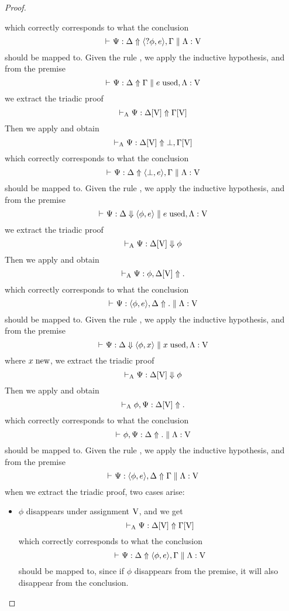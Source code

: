 \begin{proof}
\begin{itemize}
			which correctly corresponds to what the conclusion
			$$ \async{\Psi}{\Delta}{\af{\llwn{\phi}}{e}, \Gamma} \separator \constr{\Lambda}{\mathV} $$
			should be mapped to.
		\indCase{\displaybot} Given the rule \derRule{\displaybot}, we apply the inductive hypothesis, and from the premise
			$$ \async{\Psi}{\Delta}{\Gamma} \separator \constr{\used{e}, \Lambda}{\mathV} $$
			we extract the triadic proof
			$$ \async[A]{\Psi}{\Delta[\mathV]}{\Gamma[\mathV]} $$
			Then we apply \derRule[A]{\displaybot} and obtain
			$$ \async[A]{\Psi}{\Delta[\mathV]}{\llbot, \Gamma[\mathV]} $$
			which correctly corresponds to what the conclusion
			$$ \async{\Psi}{\Delta}{\af{\llbot}{e}, \Gamma} \separator \constr{\Lambda}{\mathV} $$
			should be mapped to.
		\indCase{\displaydecide[1]} Given the rule \derRule{\displaydecide[1]}, we apply the inductive hypothesis, and from the premise
			$$ \focus{\Psi}{\Delta}{\af{\phi}{e}} \separator \constr{\used{e}, \Lambda}{\mathV} $$
			we extract the triadic proof
			$$ \focus[A]{\Psi}{\Delta[\mathV]}{\phi} $$
			Then we apply \derRule[A]{\displaydecide[1]} and obtain
			$$ \async[A]{\Psi}{\phi, \Delta[\mathV]}{.} $$
			which correctly corresponds to what the conclusion
			$$ \async{\Psi}{\af{\phi}{e}, \Delta}{.} \separator \constr{\Lambda}{\mathV} $$
			should be mapped to.
		\indCase{\displaydecide[2]} Given the rule \derRule{\displaydecide[2]}, we apply the inductive hypothesis, and from the premise
			$$ \focus{\Psi}{\Delta}{\af{\phi}{x}} \separator \constr{\used{x}, \Lambda}{\mathV} $$
			where $\new{x}$, we extract the triadic proof
			$$ \focus[A]{\Psi}{\Delta[\mathV]}{\phi} $$
			Then we apply \derRule[A]{\displaydecide[2]} and obtain
			$$ \async[A]{\phi, \Psi}{ \Delta[\mathV]}{.} $$
			which correctly corresponds to what the conclusion
			$$ \async{\phi, \Psi}{\Delta}{.} \separator \constr{\Lambda}{\mathV} $$
			should be mapped to.
		\indCase{\displaytodelta} Given the rule \derRule{\displaytodelta}, we apply the inductive hypothesis, and from the premise
			$$ \async{\Psi}{\af{\phi}{e}, \Delta}{\Gamma} \separator \constr{\Lambda}{\mathV} $$
			when we extract the triadic proof, two cases arise:
			\begin{itemize}
				\item $\phi$ disappears under assignment $\mathV$, and we get
					$$ \async[A]{\Psi}{\Delta[\mathV]}{\Gamma[\mathV]} $$
					which correctly corresponds to what the conclusion
					$$ \async{\Psi}{\Delta}{\af{\phi}{e}, \Gamma} \separator \constr{\Lambda}{\mathV} $$
					should be mapped to, since if $\phi$ disappears from the premise, it will also disappear from the conclusion.

\end{itemize}
\end{itemize}
\end{proof}
